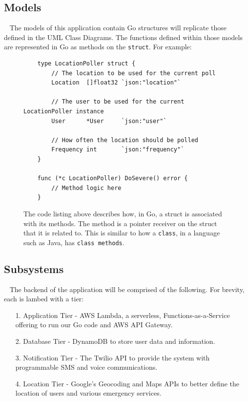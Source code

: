 \documentclass[10pt, a4paper]{article}
\begin{document}
\subsection{Models}
\par ~ The models of this application contain Go structures will replicate those defined in the UML Class Diagrams. The functions defined within those models are represented in Go as methods on the \texttt{struct}. For example:

\begin{figure}[H]
	\begin{center}
	\begin{lstlisting}
	type LocationPoller struct {
		// The location to be used for the current poll
		Location  []float32 `json:"location"`
		
		// The user to be used for the current LocationPoller instance
		User      *User     `json:"user"`
		
		// How often the location should be polled	
		Frequency int       `json:"frequency"`
	}

	func (*c LocationPoller) DoSevere() error {
		// Method logic here	
	}
	\end{lstlisting}
	\end{center}
\caption{The code listing above describes how, in Go, a struct is associated with its methods. The method is a pointer receiver on the struct that it is related to. This is similar to how a \texttt{class}, in a language such as Java, has \texttt{class methods}.}
\end{figure}

\subsection{Subsystems}
\par ~ The backend of the application will be comprised of the following. For brevity, each is lambed with a tier:
\begin{enumerate}
	\item[1.] Application Tier - AWS Lambda, a serverless, Functions-as-a-Service offering to run our Go code and AWS API Gateway.
	\item[2.] Database Tier - DynamoDB to store user data and information.
	\item[3.] Notification Tier - The Twilio API to provide the system with programmable SMS and voice communications.
	\item[4.] Location Tier - Google's Geocoding and Maps APIs to better define the location of users and various emergency services.
\end{enumerate}
\end{document}
